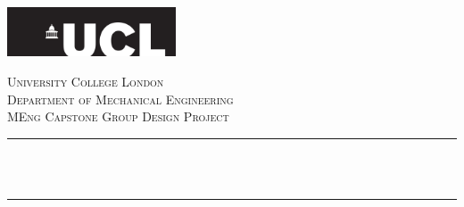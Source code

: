 \begin{titlepage}

  \newcommand{\HRule}{\rule{\linewidth}{0.5mm}} %

  \center
  \includegraphics[width=5cm]{Title/UCL.png}\\[1cm] %


  \center %


  \textsc{\LARGE University College London }\\[1.5cm] %
  \textsc{\Large Department of Mechanical Engineering  }\\[0.5cm] %
  \textsc{\large MEng Capstone Group Design Project }\\[0.5cm] %

  \makeatletter
  \HRule \\[0.4cm]
  { \huge \bfseries \@title}\\[0.4cm] %
  \HRule \\[1.5cm]



\end{titlepage}
